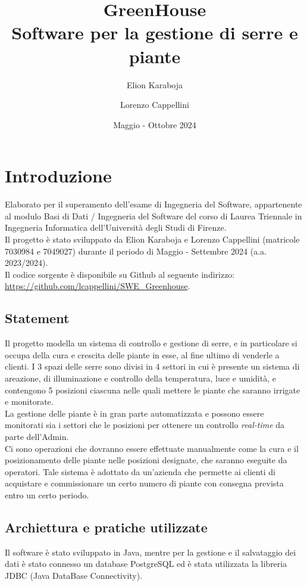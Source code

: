 \documentclass{article}
\title{GreenHouse \\ \vspace{0.5cm} {Software per la gestione di serre e piante}}
\author{Elion Karaboja \\ \and Lorenzo Cappellini}
\date{Maggio - Ottobre 2024}
\begin{document}


\tableofcontents

\newpage
\section{Introduzione}
Elaborato per il superamento dell’esame di Ingegneria del Software, appartenente al modulo Basi di Dati / Ingegneria del Software del corso di Laurea Triennale in Ingegneria Informatica dell’Università degli Studi di Firenze.
\\

\noindent Il progetto è stato sviluppato da Elion Karaboja e Lorenzo Cappellini (matricole 7030984 e 7049027) durante il periodo di Maggio - Settembre 2024 (a.a. 2023/2024).
\\

\noindent Il codice sorgente è disponibile su Github al seguente indirizzo:\\ 
\href{https://github.com/lcappellini/SWE_Greenhouse}{https://github.com/lcappellini/SWE\_Greenhouse}.

\subsection{Statement}
Il progetto modella un sistema di controllo e gestione di serre, e in particolare si occupa della cura e crescita delle piante in esse, al fine ultimo di venderle a clienti. 
I 3 spazi delle serre sono divisi in 4 settori in cui è presente un sistema di areazione, di illuminazione e controllo della temperatura, luce e umidità, e contengono 5 posizioni ciascuna nelle quali mettere le piante che saranno irrigate e monitorate. \\
La gestione delle piante è in gran parte automatizzata e possono essere monitorati sia i settori che le posizioni per ottenere un controllo \textit{real-time} da parte dell'Admin.\\ Ci sono operazioni che dovranno essere effettuate manualmente come la cura e il posizionamento delle piante nelle posizioni designate, che saranno eseguite da operatori. Tale sistema è adottato da un'azienda che permette ai clienti di acquistare e commissionare un certo numero di piante con consegna prevista entro un certo periodo.
\subsection{Archiettura e pratiche utilizzate}
Il software è stato sviluppato in Java, mentre per la gestione e il salvataggio dei dati è stato connesso un database PostgreSQL ed è stata utilizzata la libreria JDBC (Java DataBase Connectivity).
\\
\end{document}
